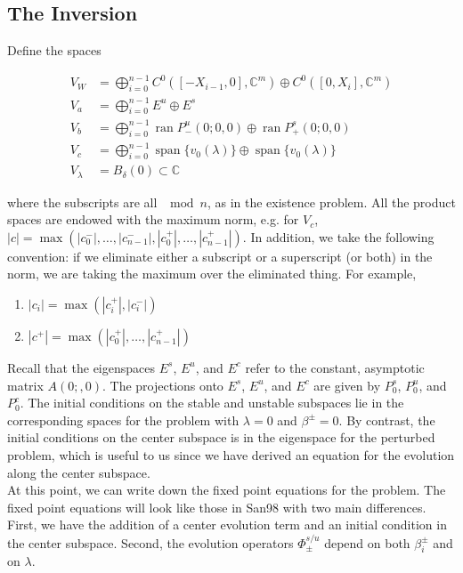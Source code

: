 \documentclass[12pt]{article}
\def\C{{\mathbb C}}
\DeclareMathOperator{\spn}{span}
\DeclareMathOperator{\ran}{ran}
\begin{document}
\subsection{The Inversion}

Define the spaces

\begin{align*}
V_W &= \bigoplus_{i=0}^{n-1} C^0([-X_{i-1}, 0], \C^m) \oplus C^0([0, X_i], \C^m) \\
V_a &= \bigoplus_{i=0}^{n-1} E^u \oplus E^s\\
V_b &= \bigoplus_{i=0}^{n-1} \ran P^u_-(0; 0, 0) \oplus \ran P^s_+(0; 0, 0) \\
V_c &= \bigoplus_{i=0}^{n-1} \spn \{v_0(\lambda)\} \oplus \spn \{v_0(\lambda)\} \\
V_\lambda &= B_\delta(0) \subset \C
\end{align*}

where the subscripts are all $\mod n$, as in the existence problem. All the product spaces are endowed with the maximum norm, e.g. for $V_c$, $|c| = \max(|c_0^-|, \dots, |c_{n-1}^-|, |c_0^+|, \dots, |c_{n-1}^+|)$. In addition, we take the following convention: if we eliminate either a subscript or a superscript (or both) in the norm, we are taking the maximum over the eliminated thing. For example,
\begin{enumerate}
	\item $|c_i| = \max(|c_i^+|, |c_i^-|)$ 
	\item $|c^+| = \max(|c_0^+|, \dots, |c_{n-1}^+|)$
\end{enumerate} 

Recall that the eigenspaces $E^s$, $E^u$, and $E^c$ refer to the constant, asymptotic matrix $A(0;, 0)$. The projections onto $E^s$, $E^u$, and $E^c$ are given by $P_0^s$, $P_0^u$, and $P_0^c$. The initial conditions on the stable and unstable subspaces lie in the corresponding spaces for the problem with $\lambda = 0$ and $\beta^\pm = 0$. By contrast, the initial conditions on the center subspace is in the eigenspace for the perturbed problem, which is useful to us since we have derived an equation for the evolution along the center subspace.\\

At this point, we can write down the fixed point equations for the problem. The fixed point equations will look like those in San98 with two main differences. First, we have the addition of a center evolution term and an initial condition in the center subspace. Second, the evolution operators $\Phi^{s/u}_\pm$ depend on both $\beta_i^\pm$ and on $\lambda$.\\
\end{document}

